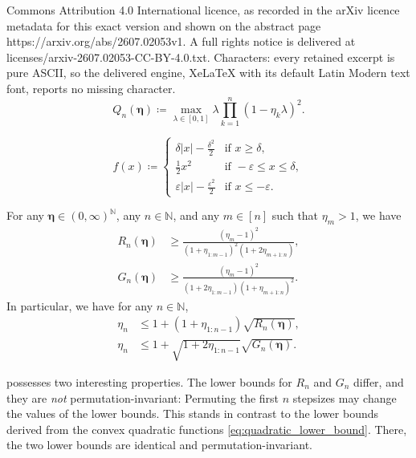 \documentclass[10pt,a4paper]{amsart}
\newcommand{\N}{\mathbb{N}}
\newcommand{\abs}[1]{\left\lvert#1\right\rvert}
\newcommand{\schedule}{\bm{\eta}}
\begin{document}
Commons Attribution 4.0 International licence, as recorded in the arXiv licence metadata for this exact version and shown on the abstract page https://arxiv.org/abs/2607.02053v1. A full rights notice is delivered at licenses/arxiv-2607.02053-CC-BY-4.0.txt. Characters: every retained excerpt is pure ASCII, so the delivered engine, XeLaTeX with its default Latin Modern text font, reports no missing character.
\begin{equation}\label{eq:quadratic_lower_bound}
	Q_n(\schedule)
	\coloneqq \max_{\lambda\in[0,1]}\lambda \prod_{k=1}^n (1 - \eta_k \lambda )^2.
\end{equation}

\begin{equation}\label{eq:asymmetric_huber}
	f(x) \coloneqq \begin{cases}
		\delta\abs{x} - \frac{ \delta^2 }{2} &\text{if }x\geq\delta, \\
		\frac{1}{2}x^2 &\text{if }-\varepsilon \leq x \leq \delta, \\
		\varepsilon\abs{x} - \frac{ \varepsilon^2 }{2} &\text{if }x\leq-\varepsilon.
	\end{cases}
\end{equation}

\begin{lemma}\label{lem:asymmetric_huber}
For any $\schedule\in(0,\infty)^{\N}$, any $n\in\N$, and any $m\in[n]$ such that $\eta_m > 1$, we have
\begin{equation}\label{eq:asymmetric_huber_part_i}
\begin{split}
	R_n(\schedule) &\geq \frac{ (\eta_m-1)^2 }{ ( 1 + \eta_{1:m-1} )^2 ( 1 + 2 \eta_{m+1:n} ) }, \\
	G_n(\schedule) &\geq \frac{ (\eta_m-1)^2 }{ ( 1 + 2 \eta_{1:m-1} ) ( 1 + \eta_{m+1:n} )^2 }.
\end{split}
\end{equation}
In particular, we have for any $n\in\N$,
\begin{equation}\label{eq:asymmetric_huber_part_ii}
\begin{split}
	\eta_n &\leq 1 + (1 + \eta_{1:n-1})\sqrt{R_n(\schedule)}, \\
	\eta_n &\leq 1 + \sqrt{1 + 2\eta_{1:n-1}}\sqrt{G_n(\schedule)}.
\end{split}
\end{equation}
\end{lemma}

\begin{remark}
 possesses two interesting properties.
The lower bounds for $R_n$ and $G_n$ differ, and they are \emph{not} permutation-invariant:
Permuting the first $n$ stepsizes may change the values of the lower bounds.
This stands in contrast to the lower bounds derived from the convex quadratic functions \eqref{eq:quadratic_lower_bound}.
There, the two lower bounds are identical and permutation-invariant.
\end{remark}
\end{document}
